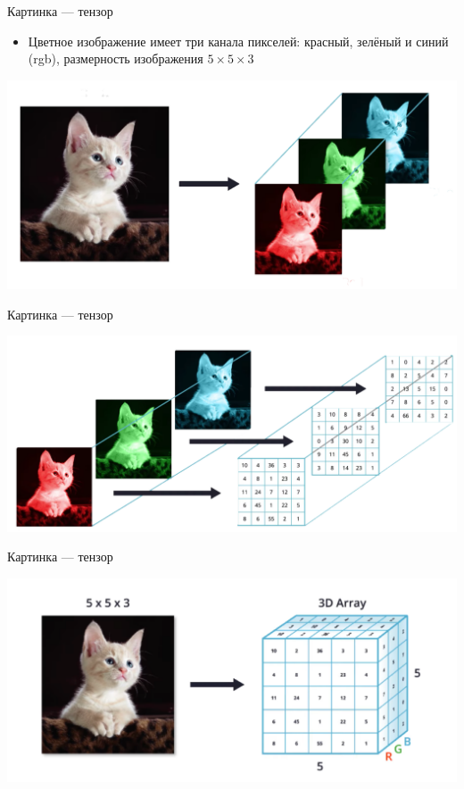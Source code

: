 \documentclass[notes,12pt, aspectratio=169]{beamer}
\begin{document}
\begin{frame}{Картинка — тензор}
\begin{itemize}
	\item Цветное изображение имеет три канала пикселей: красный, зелёный и синий (rgb), размерность изображения $5 \times 5 \times 3$
\end{itemize}

\begin{center}
\includegraphics[width=.7\linewidth]{pixels2_clean.png}
\end{center}
\end{frame}

\begin{frame}{Картинка — тензор}
\begin{center}
	\includegraphics[width=.8\linewidth]{pixels3_clean.png}
\end{center}
\end{frame}


\begin{frame}{Картинка — тензор}
\begin{center}
	\includegraphics[width=.8\linewidth]{cat_cube.png}
\end{center}
\end{frame}
\end{document}
